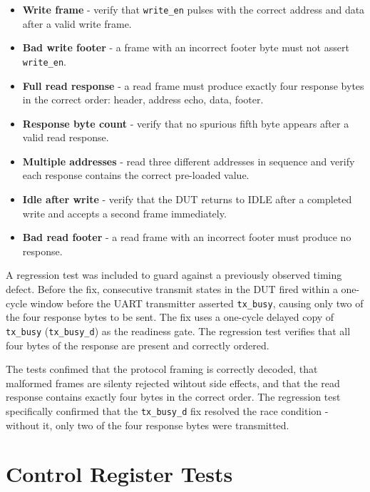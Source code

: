 \begin{itemize}
  \item \textbf{Write frame} - verify that \texttt{write\_en} pulses with the correct address and data after a valid write frame.
  \item \textbf{Bad write footer} - a frame with an incorrect footer byte must not assert \texttt{write\_en}.
  \item \textbf{Full read response} - a read frame must produce exactly four response bytes in the correct order: header, address echo, data, footer.
  \item \textbf{Response byte count} - verify that no spurious fifth byte appears after a valid read response.
  \item \textbf{Multiple addresses} - read three different addresses in sequence and verify each response contains the correct pre-loaded value.
  \item \textbf{Idle after write} - verify that the DUT returns to IDLE after a completed write and accepts a second frame immediately.
  \item \textbf{Bad read footer} - a read frame with an incorrect footer must produce no response.
\end{itemize}

A regression test was included to guard against a previously observed timing defect. Before the fix, consecutive transmit states in the DUT fired within a one-cycle window before the UART transmitter asserted \texttt{tx\_busy}, causing only two of the four response bytes to be sent. The fix uses a one-cycle delayed copy of \texttt{tx\_busy} (\texttt{tx\_busy\_d}) as the readiness gate. The regression test verifies that all four bytes of the response are present and correctly ordered.

The tests confimed that the protocol framing is correctly decoded, that malformed frames are silenty rejected wihtout side effects, and that the read response contains exactly four bytes in the correct order. The regression test specifically confirmed that the \texttt{tx\_busy\_d} fix resolved the race condition - without it, only two of the four response bytes were transmitted.

\section{Control Register Tests}

